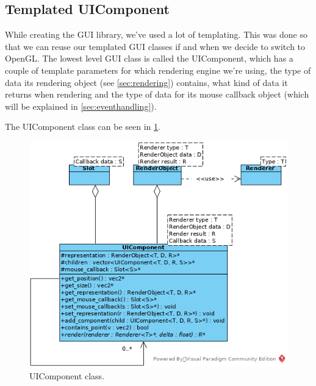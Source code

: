 \subsection{Templated UIComponent}
While creating the GUI library, we've used a lot of templating. This was done 
so that we can reuse our templated GUI classes if and when we decide to 
switch to OpenGL. The lowest level GUI class is called the UIComponent, 
which has a couple of template parameters for which rendering engine we're 
using,  the type of data its rendering object (see \cref{sec:rendering}) 
contains, what kind of data it returns when rendering and the type of data for 
its mouse callback object (which will be explained in 
\cref{sec:eventhandling}).

The UIComponent class can be seen in \cref{fig:uicomponent}.

\begin{figure}[!htb]
\centering
\includegraphics[scale=0.75]{res/ui/uicomponent.png}
\caption{UIComponent class.}\label{fig:uicomponent}
\end{figure}

